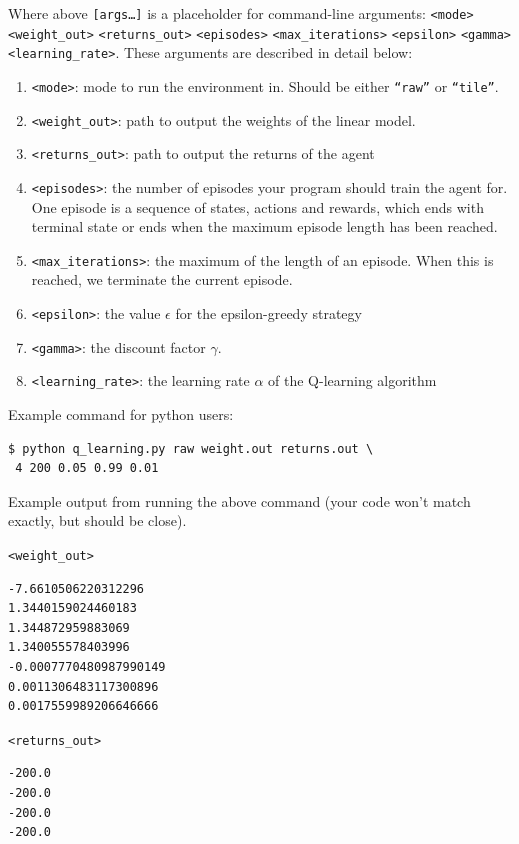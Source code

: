 \documentclass[11pt,addpoints,answers]{exam}
\begin{document}
Where above \texttt{[args\dots]} is a placeholder for command-line arguments: \texttt{<mode>} \texttt{<weight\_out>} \texttt{<returns\_out>} \texttt{<episodes>} \texttt{<max\_iterations>} \texttt{<epsilon>} \texttt{<gamma>} \texttt{<learning\_rate>}. These arguments are described in detail below:
\begin{enumerate}
    \item \texttt{<mode>}: mode to run the environment in. Should be either \texttt{``raw''} or \texttt{``tile''}.
    \item \texttt{<weight\_out>}: path to output the weights of the linear model.
    \item \texttt{<returns\_out>}: path to output the returns of the agent
    \item \texttt{<episodes>}: the number of episodes your program should train the agent for. One episode is a sequence of states, actions and rewards, which ends with terminal state or ends when the maximum episode length has been reached.
    \item \texttt{<max\_iterations>}: the maximum of the length of an episode. When this is reached, we terminate the current episode.
    \item \texttt{<epsilon>}: the value $\epsilon$ for the epsilon-greedy strategy
    \item \texttt{<gamma>}: the discount factor $\gamma$.
    \item \texttt{<learning\_rate>}: the learning rate $\alpha$ of the Q-learning algorithm
\end{enumerate}


Example command for python users:
\begin{lstlisting}[language=Shell]
$ python q_learning.py raw weight.out returns.out \ 
 4 200 0.05 0.99 0.01
\end{lstlisting}

Example output from running the above command (your code won't match exactly, but should be close).

\texttt{<weight\_out>}
\begin{lstlisting}
-7.6610506220312296
1.3440159024460183
1.344872959883069
1.340055578403996
-0.0007770480987990149
0.0011306483117300896
0.0017559989206646666
\end{lstlisting}

\texttt{<returns\_out>}
\begin{lstlisting}
-200.0
-200.0
-200.0
-200.0
\end{lstlisting}
\end{document}
